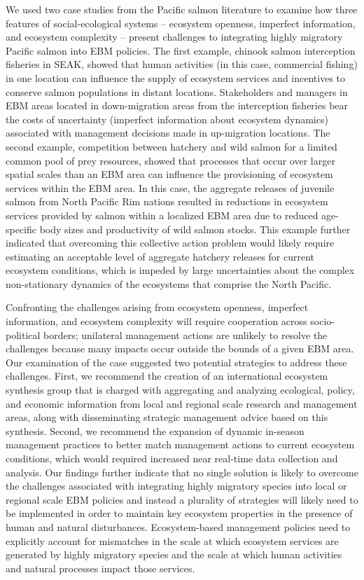 We used two case studies from the Pacific salmon literature to examine
how three features of social-ecological systems -- ecosystem openness,
imperfect information, and ecosystem complexity -- present challenges to
integrating highly migratory Pacific salmon into EBM policies. The first
example, chinook salmon interception fisheries in SEAK, showed that
human activities (in this case, commercial fishing) in one location can
influence the supply of ecosystem services and incentives to conserve
salmon populations in distant locations. Stakeholders and managers in
EBM areas located in down-migration areas from the interception
fisheries bear the costs of uncertainty (imperfect information about
ecosystem dynamics) associated with management decisions made in
up-migration locations. The second example, competition between hatchery
and wild salmon for a limited common pool of prey resources, showed that
processes that occur over larger spatial scales than an EBM area can
influence the provisioning of ecosystem services within the EBM area. In
this case, the aggregate releases of juvenile salmon from North Pacific
Rim nations resulted in reductions in ecosystem services provided by
salmon within a localized EBM area due to reduced age-specific body
sizes and productivity of wild salmon stocks. This example further
indicated that overcoming this collective action problem would likely
require estimating an acceptable level of aggregate hatchery releases
for current ecosystem conditions, which is impeded by large
uncertainties about the complex non-stationary dynamics of the
ecosystems that comprise the North Pacific.

Confronting the challenges arising from ecosystem openness, imperfect
information, and ecosystem complexity will require cooperation across
socio-political borders; unilateral management actions are unlikely to
resolve the challenges because many impacts occur outside the bounds of
a given EBM area. Our examination of the case suggested two potential
strategies to address these challenges. First, we recommend the creation
of an international ecosystem synthesis group that is charged with
aggregating and analyzing ecological, policy, and economic information
from local and regional scale research and management areas, along with
disseminating strategic management advice based on this synthesis.
Second, we recommend the expansion of dynamic in-season management
practices to better match management actions to current ecosystem
conditions, which would required increased near real-time data
collection and analysis. Our findings further indicate that no single
solution is likely to overcome the challenges associated with
integrating highly migratory species into local or regional scale EBM
policies and instead a plurality of strategies will likely need to be
implemented in order to maintain key ecosystem properties in the
presence of human and natural disturbances. Ecosystem-based management
policies need to explicitly account for mismatches in the scale at which
ecosystem services are generated by highly migratory species and the
scale at which human activities and natural processes impact those
services.

